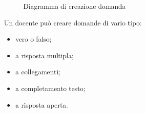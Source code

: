 \documentclass[a4paper, titlepage]{article}
\begin{document}
\newpage
{}
\begin{figure}[H]
	\centering
	\noindent{}
	\caption{Diagramma di creazione domanda}
\end{figure}
Un docente può creare domande di vario tipo:
\begin{itemize}
	\item vero o falso;
	\item a risposta multipla;
	\item a collegamenti;
	\item a completamento testo;
	\item a risposta aperta.
\end{itemize}
\end{document}

